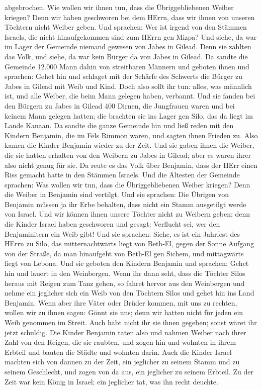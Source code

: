 abgebrochen.  Wie wollen wir ihnen tun, dass die
Übriggebliebenen Weiber kriegen? Denn wir haben geschworen bei dem
HErrn, dass wir ihnen von unseren Töchtern nicht Weiber geben.
 Und sprachen: Wer ist irgend von den Stämmen Israels, die
nicht hinaufgekommen sind zum HErrn gen Mizpa? Und siehe, da war im
Lager der Gemeinde niemand gewesen von Jabes in Gilead. 
Denn sie zählten das Volk, und siehe, da war kein Bürger da von Jabes in
Gilead.  Da sandte die Gemeinde 12.000 Mann dahin von
streitbaren Männern und geboten ihnen und sprachen: Gehet hin und
schlaget mit der Schärfe des Schwerts die Bürger zu Jabes in Gilead mit
Weib und Kind.  Doch also sollt ihr tun: alles, was
männlich ist, und alle Weiber, die beim Mann gelegen haben, verbannt.
 Und sie fanden bei den Bürgern zu Jabes in Gilead 400
Dirnen, die Jungfrauen waren und bei keinem Mann gelegen hatten; die
brachten sie ins Lager gen Silo, das da liegt im Lande Kanaan.
 Da sandte die ganze Gemeinde hin und ließ reden mit den
Kindern Benjamin, die im Fels Rimmon waren, und sagten ihnen Frieden zu.
 Also kamen die Kinder Benjamin wieder zu der Zeit. Und sie
gaben ihnen die Weiber, die sie hatten erhalten von den Weibern zu Jabes
in Gilead; aber es waren ihrer also nicht genug für sie. 
Da reute es das Volk über Benjamin, dass der HErr einen Riss gemacht
hatte in den Stämmen Israels.  Und die Ältesten der
Gemeinde sprachen: Was wollen wir tun, dass die Übriggebliebenen Weiber
kriegen? Denn die Weiber in Benjamin sind vertilgt.  Und
sie sprachen: Die Übrigen von Benjamin müssen ja ihr Erbe behalten, dass
nicht ein Stamm ausgetilgt werde von Israel.  Und wir
können ihnen unsere Töchter nicht zu Weibern geben; denn die Kinder
Israel haben geschworen und gesagt: Verflucht sei, wer den Benjaminitern
ein Weib gibt!  Und sie sprachen: Siehe, es ist ein
Jahrfest des HErrn zu Silo, das mitternachtwärts liegt von Beth-El,
gegen der Sonne Aufgang von der Straße, da man hinaufgeht von Beth-El
gen Sichem, und mittagwärts liegt von Lebona.  Und sie
geboten den Kindern Benjamin und sprachen: Gehet hin und lauert in den
Weinbergen.  Wenn ihr dann seht, dass die Töchter Silos
heraus mit Reigen zum Tanz gehen, so fahret hervor aus den Weinbergen
und nehme ein jeglicher sich ein Weib von den Töchtern Silos und gehet
hin ins Land Benjamin.  Wenn aber ihre Väter oder Brüder
kommen, mit uns zu rechten, wollen wir zu ihnen sagen: Gönnt sie uns;
denn wir hatten nicht für jeden ein Weib genommen im Streit. Auch habt
nicht ihr sie ihnen gegeben; sonst wäret ihr jetzt schuldig.
 Die Kinder Benjamin taten also und nahmen Weiber nach
ihrer Zahl von den Reigen, die sie raubten, und zogen hin und wohnten in
ihrem Erbteil und bauten die Städte und wohnten darin. 
Auch die Kinder Israel machten sich von dannen zu der Zeit, ein
jeglicher zu seinem Stamm und zu seinem Geschlecht, und zogen von da
aus, ein jeglicher zu seinem Erbteil.  Zu der Zeit war kein
König in Israel; ein jeglicher tat, was ihn recht deuchte.
